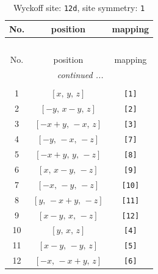 \documentclass[fleqn,8pt]{jsarticle}
\begin{document}
\renewcommand{\arraystretch}{1.2}
\begin{longtable}{ccc}
\caption{Wyckoff site: {\tt 12d}, site symmetry: {\tt 1}}
 \\
 \hline \hline
No. & position & mapping \\ \hline \endfirsthead

\multicolumn{2}{l}{\tablename\ \thetable{}} \\
 \hline \hline
No. & position & mapping \\ \hline \endhead

 \hline \hline
\multicolumn{2}{r}{\footnotesize\it continued ...} \\ \endfoot

 \hline \hline
\multicolumn{2}{r}{} \\ \endlastfoot

1 & $\left[ x,\, y,\, z \right]$ & {\tt [1]} \\ \hline
2 & $\left[ - y,\, x - y,\, z \right]$ & {\tt [2]} \\ \hline
3 & $\left[ - x + y,\, - x,\, z \right]$ & {\tt [3]} \\ \hline
4 & $\left[ - y,\, - x,\, - z \right]$ & {\tt [7]} \\ \hline
5 & $\left[ - x + y,\, y,\, - z \right]$ & {\tt [8]} \\ \hline
6 & $\left[ x,\, x - y,\, - z \right]$ & {\tt [9]} \\ \hline
7 & $\left[ - x,\, - y,\, - z \right]$ & {\tt [10]} \\ \hline
8 & $\left[ y,\, - x + y,\, - z \right]$ & {\tt [11]} \\ \hline
9 & $\left[ x - y,\, x,\, - z \right]$ & {\tt [12]} \\ \hline
10 & $\left[ y,\, x,\, z \right]$ & {\tt [4]} \\ \hline
11 & $\left[ x - y,\, - y,\, z \right]$ & {\tt [5]} \\ \hline
12 & $\left[ - x,\, - x + y,\, z \right]$ & {\tt [6]} \\
\end{longtable}
\end{document}
